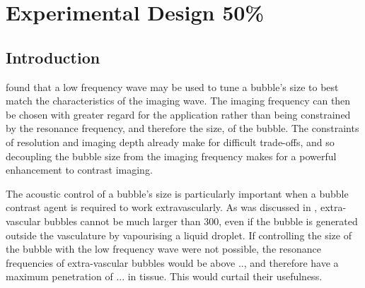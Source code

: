 
\chapter{Experimental Design 50\%}\label{ch:rationale}



\section{Introduction}


 found that a low frequency wave may be used to tune a 
bubble's size to best match the characteristics of the imaging wave.
The imaging frequency can then be chosen with greater regard for the application
rather than being constrained by the resonance frequency,
and therefore the size, of the bubble.
The constraints of resolution and imaging depth  already make for difficult trade-offs,
and so decoupling the bubble size from the imaging frequency makes for a powerful enhancement to contrast imaging.

The acoustic control of a bubble's size is  particularly important when a bubble contrast agent is 
required to work extravascularly.
As was discussed in  , 
extra-vascular bubbles cannot be much larger than  \unit{300}\nano\metre,
even if the bubble is generated outside the vasculature by vapourising a liquid droplet. 
If controlling the size of the bubble with the low frequency wave were not possible,
the resonance frequencies of extra-vascular bubbles
would be above ..,
and therefore have a maximum penetration of ... in tissue.
This would  curtail their  usefulness.

